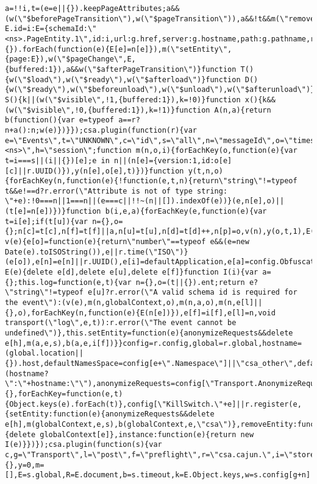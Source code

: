 \documentclass[
]{article}
\begin{document}
\begin{verbatim}
a=!!i,t=(e=e||{}).keepPageAttributes;a&&(w(\"$beforePageTransition\"),w(\"$pageTransition\")),a&&!t&&m(\"removeEntity\",\"page\"),i=o.UUID(),t?E.id=i:E={schemaId:\"<ns>.PageEntity.1\",id:i,url:g.href,server:g.hostname,path:g.pathname,referrer:v.referrer,title:v.title},Object.keys(n||{}).forEach(function(e){E[e]=n[e]}),m(\"setEntity\",{page:E}),w(\"$pageChange\",E,{buffered:1}),a&&w(\"$afterPageTransition\")}function T(){w(\"$load\"),w(\"$ready\"),w(\"$afterload\")}function D(){w(\"$ready\"),w(\"$beforeunload\"),w(\"$unload\"),w(\"$afterunload\")}function S(){k||(w(\"$visible\",!1,{buffered:1}),k=!0)}function x(){k&&(w(\"$visible\",!0,{buffered:1}),k=!1)}function A(n,a){return b(function(){var e=typeof a==r?n+a():n;w(e)})}});csa.plugin(function(r){var e=\"Events\",t=\"UNKNOWN\",c=\"id\",s=\"all\",n=\"messageId\",o=\"timestamp\",f=\"producerId\",i=\"application\",a=\"obfuscatedMarketplaceId\",l=\"entities\",u=\"schemaId\",d=\"version\",p=\"attributes\",g=\"<ns>\",h=\"session\";function m(n,o,i){forEachKey(o,function(e){var t=i===s||(i||{})[e];e in n||(n[e]={version:1,id:o[e][c]||r.UUID()}),y(n[e],o[e],t)})}function y(t,n,o){forEachKey(n,function(e){!function(e,t,n){return\"string\"!=typeof t&&e!==d?r.error(\"Attribute is not of type string: \"+e):!0===n||1===n||(e===c||!!~(n||[]).indexOf(e))}(e,n[e],o)||(t[e]=n[e])})}function b(i,e,a){forEachKey(e,function(e){var t=i[e];if(t[u]){var n={},o={};n[c]=t[c],n[f]=t[f]||a,n[u]=t[u],n[d]=t[d]++,n[p]=o,v(n),y(o,t,1),E(o),transport(\"log\",n)}})}function v(e){e[o]=function(e){return\"number\"==typeof e&&(e=new Date(e).toISOString()),e||r.time(\"ISO\")}(e[o]),e[n]=e[n]||r.UUID(),e[i]=defaultApplication,e[a]=config.ObfuscatedMarketplaceId||t,e[u]=e[u].replace(g,defaultNamesSpace)}function E(e){delete e[d],delete e[u],delete e[f]}function I(i){var a={};this.log=function(e,t){var n={},o=(t||{}).ent;return e?\"string\"!=typeof e[u]?r.error(\"A valid schema id is required for the event\"):(v(e),m(n,globalContext,o),m(n,a,o),m(n,e[l]||{},o),forEachKey(n,function(e){E(n[e])}),e[f]=i[f],e[l]=n,void transport(\"log\",e,t)):r.error(\"The event cannot be undefined\")},this.setEntity=function(e){anonymizeRequests&&delete e[h],m(a,e,s),b(a,e,i[f])}}config=r.config,global=r.global,hostname=(global.location||{}).host,defaultNamesSpace=config[e+\".Namespace\"]||\"csa_other\",defaultApplication=config.Application||\"Other\"+(hostname?\":\"+hostname:\"\"),anonymizeRequests=config[\"Transport.AnonymizeRequests\"]||!1,transport=r(\"Transport\"),globalContext={},forEachKey=function(e,t){Object.keys(e).forEach(t)},config[\"KillSwitch.\"+e]||r.register(e,{setEntity:function(e){anonymizeRequests&&delete e[h],m(globalContext,e,s),b(globalContext,e,\"csa\")},removeEntity:function(e){delete globalContext[e]},instance:function(e){return new I(e)}})});csa.plugin(function(s){var c,g=\"Transport\",l=\"post\",f=\"preflight\",r=\"csa.cajun.\",i=\"store\",a=\"deleteStored\",u=\"sendBeacon\",t=\"__merge\",e=\"messageId\",n=\".FlushInterval\",o=0,d=s.config[g+\".BufferSize\"]||2e3,h=s.config[g+\".RetryDelay\"]||1500,p=s.config[g+\".AnonymizeRequests\"]||!1,v={},y=0,m=[],E=s.global,R=E.document,b=s.timeout,k=E.Object.keys,w=s.config[g+n]||5e3,I=w,O=s.config[g+n+\".BackoffFactor\"]||1,S=s.config[g+n+\".BackoffLimit\"]||3e4,B=0;function 
\end{verbatim}
\end{document}
